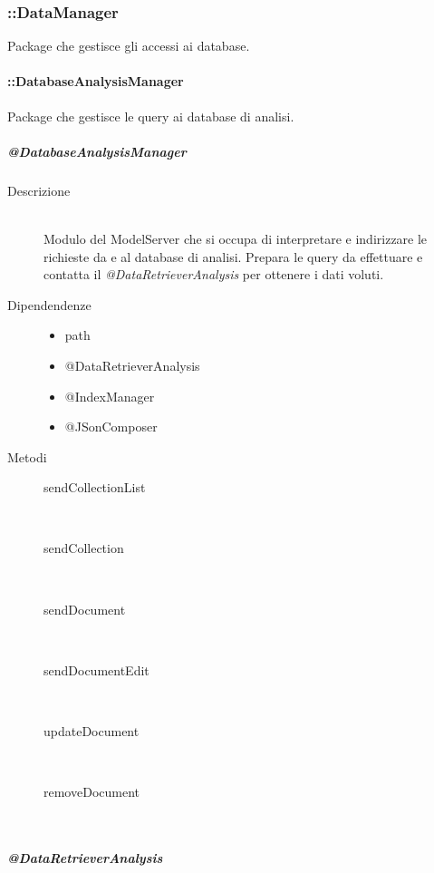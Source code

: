 \subsubsection{::DataManager}
Package che gestisce gli accessi ai database.

\paragraph{::DatabaseAnalysisManager}
Package che gestisce le query ai database di analisi. 

\subparagraph{@DatabaseAnalysisManager}

\begin{description}
 \item[Descrizione] \hfill \\
Modulo del ModelServer che si occupa di interpretare e indirizzare le richieste da e al database di analisi. 
Prepara le query da effettuare e contatta il \textit{@DataRetrieverAnalysis} per ottenere i dati voluti.
 \item[Dipendendenze] \hfill
 \begin{itemize}
  \item{path}
  \item{@DataRetrieverAnalysis}
  \item{@IndexManager}
  \item{@JSonComposer}
 \end{itemize}
  
 \item[Metodi] \hfill
 \begin{description}
 \item[sendCollectionList] \hfill \\
 \item[sendCollection] \hfill \\
 \item[sendDocument] \hfill \\
 \item[sendDocumentEdit] \hfill \\
 \item[updateDocument] \hfill \\
 \item[removeDocument] \hfill \\
 \end{description}
 
\end{description}


\subparagraph{@DataRetrieverAnalysis}

